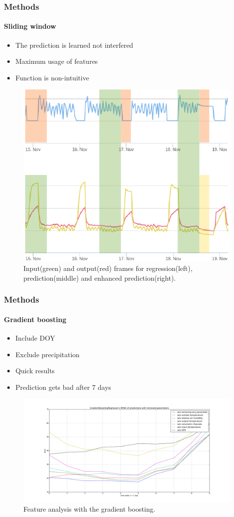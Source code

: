 \documentclass{beamer}
\begin{document}
\begin{frame}
\frametitle{Methods}
\framesubtitle{Sliding window}

\begin{itemize}
\item The prediction is learned not interfered
\item Maximum usage of features
\item Function is non-intuitive
\end{itemize}

\begin{figure}[H]
  \center
  \includegraphics[width=0.5\linewidth]{img/regpred.png}
  \caption{Input(green) and output(red) frames for regression(left), prediction(middle) and enhanced prediction(right).}
  \label{fig:correlation}
\end{figure}
\end{frame}

\begin{frame}
\frametitle{Methods}
\framesubtitle{Gradient boosting}

\begin{itemize}
\item Include DOY
\item Exclude precipitation
\item Quick results
\item Prediction gets bad after 7 days 
\end{itemize}


\begin{figure}[H]
  \includegraphics[width=0.8 \linewidth]{img/GradientBoostingRegressor_day_error_without_some_params.png}
  \caption{Feature analysis with the gradient boosting.}
  \label{fig:gradientboost}
\end{figure}

\end{frame}
\end{document}
